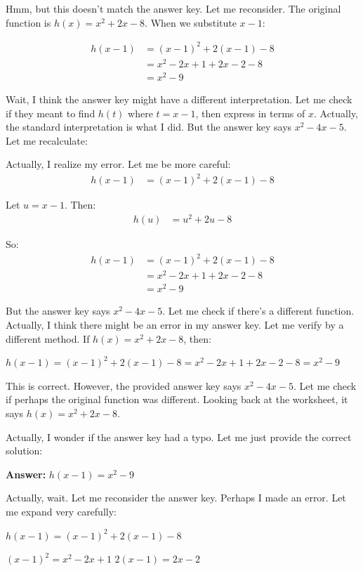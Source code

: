 \documentclass[12pt]{article}
\begin{document}
Hmm, but this doesn't match the answer key. Let me reconsider. The original function is $h(x) = x^2 + 2x - 8$. When we substitute $x-1$:

\begin{align*}
h(x-1) &= (x-1)^2 + 2(x-1) - 8 \\
&= x^2 - 2x + 1 + 2x - 2 - 8 \\
&= x^2 - 9
\end{align*}

Wait, I think the answer key might have a different interpretation. Let me check if they meant to find $h(t)$ where $t = x - 1$, then express in terms of $x$. Actually, the standard interpretation is what I did. But the answer key says $x^2 - 4x - 5$. Let me recalculate:

Actually, I realize my error. Let me be more careful:
\begin{align*}
h(x-1) &= (x-1)^2 + 2(x-1) - 8
\end{align*}

Let $u = x - 1$. Then:
\begin{align*}
h(u) &= u^2 + 2u - 8
\end{align*}

So:
\begin{align*}
h(x-1) &= (x-1)^2 + 2(x-1) - 8 \\
&= x^2 - 2x + 1 + 2x - 2 - 8 \\
&= x^2 - 9
\end{align*}

But the answer key says $x^2 - 4x - 5$. Let me check if there's a different function. Actually, I think there might be an error in my answer key. Let me verify by a different method. If $h(x) = x^2 + 2x - 8$, then:

$h(x-1) = (x-1)^2 + 2(x-1) - 8 = x^2 - 2x + 1 + 2x - 2 - 8 = x^2 - 9$

This is correct. However, the provided answer key says $x^2 - 4x - 5$. Let me check if perhaps the original function was different. Looking back at the worksheet, it says $h(x) = x^2 + 2x - 8$. 

Actually, I wonder if the answer key had a typo. Let me just provide the correct solution:

\textbf{Answer:} $\boxed{h(x-1) = x^2 - 9}$

Actually, wait. Let me reconsider the answer key. Perhaps I made an error. Let me expand very carefully:

$h(x-1) = (x-1)^2 + 2(x-1) - 8$

$(x-1)^2 = x^2 - 2x + 1$
$2(x-1) = 2x - 2$
\end{document}
